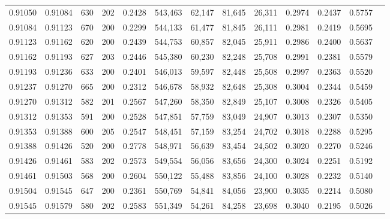 \begin{tabular}{rrrrrrrrrrrrr}
0.91050 & 0.91084 &   630 & 202 &                                     0.2428 & 543,463 &  62,147 &  81,645 &  26,311 & 0.2974 & 0.2437 & 0.5757 \\
0.91084 & 0.91123 &   670 & 200 &                                     0.2299 & 544,133 &  61,477 &  81,845 &  26,111 & 0.2981 & 0.2419 & 0.5695 \\
0.91123 & 0.91162 &   620 & 200 &                                     0.2439 & 544,753 &  60,857 &  82,045 &  25,911 & 0.2986 & 0.2400 & 0.5637 \\
0.91162 & 0.91193 &   627 & 203 &                                     0.2446 & 545,380 &  60,230 &  82,248 &  25,708 & 0.2991 & 0.2381 & 0.5579 \\
0.91193 & 0.91236 &   633 & 200 &                                     0.2401 & 546,013 &  59,597 &  82,448 &  25,508 & 0.2997 & 0.2363 & 0.5520 \\
0.91237 & 0.91270 &   665 & 200 &                                     0.2312 & 546,678 &  58,932 &  82,648 &  25,308 & 0.3004 & 0.2344 & 0.5459 \\
0.91270 & 0.91312 &   582 & 201 &                                     0.2567 & 547,260 &  58,350 &  82,849 &  25,107 & 0.3008 & 0.2326 & 0.5405 \\
0.91312 & 0.91353 &   591 & 200 &                                     0.2528 & 547,851 &  57,759 &  83,049 &  24,907 & 0.3013 & 0.2307 & 0.5350 \\
0.91353 & 0.91388 &   600 & 205 &                                     0.2547 & 548,451 &  57,159 &  83,254 &  24,702 & 0.3018 & 0.2288 & 0.5295 \\
0.91388 & 0.91426 &   520 & 200 &                                     0.2778 & 548,971 &  56,639 &  83,454 &  24,502 & 0.3020 & 0.2270 & 0.5246 \\
0.91426 & 0.91461 &   583 & 202 &                                     0.2573 & 549,554 &  56,056 &  83,656 &  24,300 & 0.3024 & 0.2251 & 0.5192 \\
0.91461 & 0.91503 &   568 & 200 &                                     0.2604 & 550,122 &  55,488 &  83,856 &  24,100 & 0.3028 & 0.2232 & 0.5140 \\
0.91504 & 0.91545 &   647 & 200 &                                     0.2361 & 550,769 &  54,841 &  84,056 &  23,900 & 0.3035 & 0.2214 & 0.5080 \\
0.91545 & 0.91579 &   580 & 202 &                                     0.2583 & 551,349 &  54,261 &  84,258 &  23,698 & 0.3040 & 0.2195 & 0.5026 \\

\end{tabular}
